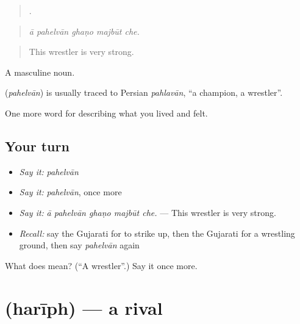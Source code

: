 \begin{quote}
    .
\end{quote}

\begin{quote}
\emph{ā pahelvān ghaṇo majbūt che.}
\end{quote}

\begin{quote}
This wrestler is very strong.
\end{quote}

A masculine noun.

\begin{cousinweb}
\textbf{} (\emph{pahelvān}) is usually traced to Persian \emph{pahlavān}, \textquotedblleft{}a champion, a wrestler\textquotedblright{}.
\end{cousinweb}

\begin{grammarlens}[title={What you've built}]
One more word for describing what you lived and felt.
\end{grammarlens}

\subsection*{Your turn}
\begin{itemize}
\raggedright
  \item \emph{Say it:} \emph{pahelvān}
  \item \emph{Say it:} \emph{pahelvān}, once more
  \item \emph{Say it:} \emph{ā pahelvān ghaṇo majbūt che.} — This wrestler is very strong.
  \item \emph{Recall:} say the Gujarati for to strike up, then the Gujarati for a wrestling ground, then say \emph{pahelvān} again
\end{itemize}

\begin{tcolorbox}[breakable,colback=teal!4,colframe=teal!35!black,title={Before you move on}]
What does  mean? (\textquotedblleft{}A wrestler\textquotedblright{}.) Say it once more.
\end{tcolorbox}
\section[\texorpdfstring{\gu{હરીફ} (harīph)}{હરીફ (harīph)}]{ (harīph) — a rival}

\label{lesson:GU-C527-hariph}



